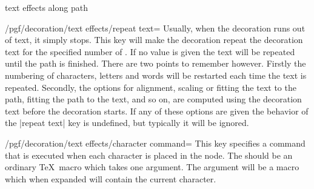 \begin{decoration}{text effects along path}
\begin{codeexample}[preamble={\usetikzlibrary{decorations.text}}]
\end{codeexample}

    \begin{key}{/pgf/decoration/text effects/repeat text=}
        Usually, when the decoration runs out of text, it simply stops. This
        key will make the decoration repeat the decoration text for the
        specified number of . If no value is given the text will be
        repeated until the path is finished. There are two points to remember
        however. Firstly the numbering of characters, letters and words will be
        restarted each time the text is repeated. Secondly, the options for
        alignment, scaling or fitting the text to the path, fitting the path to
        the text, and so on, are computed using the decoration text before the
        decoration starts. If any of these options are given the behavior of
        the |repeat text| key is undefined, but typically it will be ignored.
\begin{codeexample}[preamble={\usetikzlibrary{decorations.text}}]
\end{codeexample}
    \end{key}

    \begin{key}{/pgf/decoration/text effects/character command=}
        This key specifies a command that is executed when each character is
        placed in the node. The  should be an ordinary \TeX\ macro
        which takes one argument. The argument will be a macro which when
        expanded will contain the current character.
\begin{codeexample}[preamble={\usetikzlibrary{decorations.text}}]
\def\mycommand#1{#1$_\n$}
\begin{tikzpicture}[decoration={text effects along path,
  text={text effects along path!},
  text effects/.cd,
    path from text, path from text angle=60, group letters,
    word count=\n,
    every word/.style={character command=\mycommand},
    characters={text along path}}]


\end{tikzpicture}
\end{codeexample}
\end{key}
\end{decoration}
